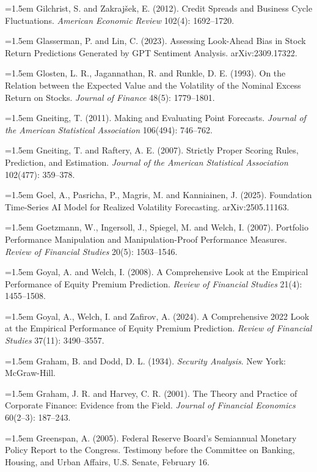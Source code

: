 \hangindent=1.5em Gilchrist, S. and Zakraj\v{s}ek, E. (2012). Credit Spreads and Business Cycle Fluctuations. \emph{American Economic Review} 102(4): 1692--1720.

\hangindent=1.5em Glasserman, P. and Lin, C. (2023). Assessing Look-Ahead Bias in Stock Return Predictions Generated by GPT Sentiment Analysis. arXiv:2309.17322.

\hangindent=1.5em Glosten, L. R., Jagannathan, R. and Runkle, D. E. (1993). On the Relation between the Expected Value and the Volatility of the Nominal Excess Return on Stocks. \emph{Journal of Finance} 48(5): 1779--1801.

\hangindent=1.5em Gneiting, T. (2011). Making and Evaluating Point Forecasts. \emph{Journal of the American Statistical Association} 106(494): 746--762.

\hangindent=1.5em Gneiting, T. and Raftery, A. E. (2007). Strictly Proper Scoring Rules, Prediction, and Estimation. \emph{Journal of the American Statistical Association} 102(477): 359--378.

\hangindent=1.5em Goel, A., Pasricha, P., Magris, M. and Kanniainen, J. (2025). Foundation Time-Series AI Model for Realized Volatility Forecasting. arXiv:2505.11163.

\hangindent=1.5em Goetzmann, W., Ingersoll, J., Spiegel, M. and Welch, I. (2007). Portfolio Performance Manipulation and Manipulation-Proof Performance Measures. \emph{Review of Financial Studies} 20(5): 1503--1546.

\hangindent=1.5em Goyal, A. and Welch, I. (2008). A Comprehensive Look at the Empirical Performance of Equity Premium Prediction. \emph{Review of Financial Studies} 21(4): 1455--1508.

\hangindent=1.5em Goyal, A., Welch, I. and Zafirov, A. (2024). A Comprehensive 2022 Look at the Empirical Performance of Equity Premium Prediction. \emph{Review of Financial Studies} 37(11): 3490--3557.

\hangindent=1.5em Graham, B. and Dodd, D. L. (1934). \emph{Security Analysis}. New York: McGraw-Hill.

\hangindent=1.5em Graham, J. R. and Harvey, C. R. (2001). The Theory and Practice of Corporate Finance: Evidence from the Field. \emph{Journal of Financial Economics} 60(2--3): 187--243.

\hangindent=1.5em Greenspan, A. (2005). Federal Reserve Board's Semiannual Monetary Policy Report to the Congress. Testimony before the Committee on Banking, Housing, and Urban Affairs, U.S. Senate, February 16.

